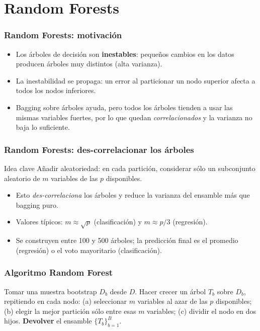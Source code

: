 \documentclass[aspectratio=169, 10pt]{beamer}
\begin{document}
\section{Random Forests}
\begin{frame}
\frametitle{Random Forests: motivaci\'on}
\begin{itemize}
\item Los \'arboles de decisi\'on son \textbf{inestables}: peque\~{n}os cambios en los datos producen \'arboles muy distintos (alta varianza).
\item La inestabilidad se propaga: un error al particionar un nodo superior afecta a todos los nodos inferiores.
\item Bagging sobre \'arboles ayuda, pero todos los \'arboles tienden a usar las mismas variables fuertes, por lo que quedan \emph{correlacionados} y la varianza no baja lo suficiente.
\end{itemize}
\end{frame}

\begin{frame}
\frametitle{Random Forests: des-correlacionar los \'arboles}
\begin{block}{Idea clave}
A\~{n}adir aleatoriedad: en cada partici\'on, considerar s\'olo un subconjunto aleatorio de $m$ variables de las $p$ disponibles.
\end{block}
\begin{itemize}
	\item Esto \emph{des-correlaciona} los \'arboles y reduce la varianza del ensamble m\'as que bagging puro.
	\pause
	\item Valores t\'ipicos: $m \approx \sqrt{p}$ (clasificaci\'on) y $m \approx p/3$ (regresi\'on).
	\pause
	\item Se construyen entre 100 y 500 \'arboles; la predicci\'on final es el promedio (regresi\'on) o el voto mayoritario (clasificaci\'on).
\end{itemize}
\end{frame}

\begin{frame}
\frametitle{Algoritmo Random Forest}
\begin{algorithmic}[1]
  \STATE Tomar una muestra bootstrap $D_b$ desde $D$.
  \STATE Hacer crecer un \'arbol $T_b$ sobre $D_b$, repitiendo en cada nodo:
  \STATE \quad (a) seleccionar $m$ variables al azar de las $p$ disponibles;
  \STATE \quad (b) elegir la mejor partici\'on s\'olo entre esas $m$ variables;
  \STATE \quad (c) dividir el nodo en dos hijos.
\ENDFOR
\STATE \textbf{Devolver} el ensamble $\{T_b\}_{b=1}^{B}$.
\end{algorithmic}
\end{frame}
\end{document}

